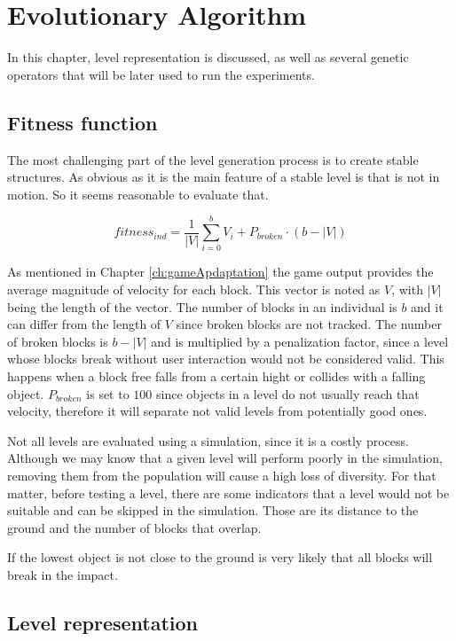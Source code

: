 \chapter{Evolutionary Algorithm}\label{ch:Representation}

In this chapter, level representation is discussed, as well as several genetic operators that will be later used to run the experiments. 

\section{Fitness function}

The most challenging part of the level generation process is to create stable structures. As obvious as it is the main feature of a stable level is that is not in motion. So it seems reasonable to evaluate that. 

$$fitness_{ind} = \frac{1}{|V|}\sum_{i=0}^{b}{V_i} + P_{broken}\cdot(b-|V|)$$

As mentioned in Chapter \ref{ch:gameApdaptation} the game output provides the average magnitude of velocity for each block. This vector is noted as $V$, with $|V|$ being the length of the vector. The number of blocks in an individual is $b$ and it can differ from the length of $V$ since broken blocks are not tracked. The number of broken blocks is $b-|V|$ and is multiplied by a penalization factor, since a level whose blocks break without user interaction would not be considered valid. This happens when a block free falls from a certain hight or collides with a falling object. $P_{broken}$ is set to $100$ since objects in a level do not usually reach that velocity, therefore it will separate not valid levels from potentially good ones.

Not all levels are evaluated using a simulation, since it is a costly process. Although we may know that a given level will perform poorly in the simulation, removing them from the population will cause a high loss of diversity. For that matter, before testing a level, there are some indicators that a level would not be suitable and can be skipped in the simulation. Those are its distance to the ground and the number of blocks that overlap.

If the lowest object is not close to the ground is very likely that all blocks will break in the impact. 

\section{Level representation}

